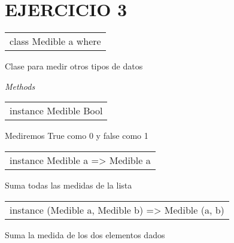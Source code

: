 \section{EJERCICIO 3}
\begin{haddockdesc}
\item[\begin{tabular}{@{}l}
class Medible a where
\end{tabular}]
{\haddockbegindoc
Clase para medir otros tipos de datos\par
\haddockpremethods{}\emph{Methods}
}
\end{haddockdesc}
\begin{haddockdesc}
\item[\begin{tabular}{@{}l}
instance Medible Bool
\end{tabular}]
{\haddockbegindoc
Mediremos True como 0  y false como 1\par}
\end{haddockdesc}
\begin{haddockdesc}
\item[\begin{tabular}{@{}l}
instance Medible a => Medible {\char 91}a{\char 93}
\end{tabular}]
{\haddockbegindoc
Suma todas las medidas de la lista\par}
\end{haddockdesc}
\begin{haddockdesc}
\item[\begin{tabular}{@{}l}
instance (Medible a, Medible b) => Medible (a, b)
\end{tabular}]
{\haddockbegindoc
Suma la medida de los dos elementos dados\par}
\end{haddockdesc}
